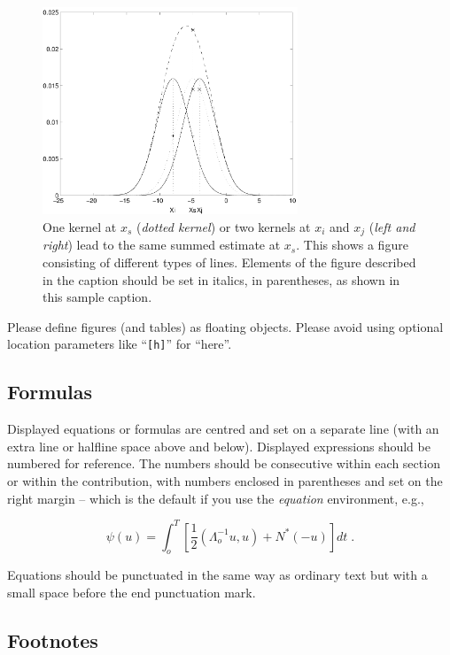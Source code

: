\documentclass[runningheads,a4paper]{llncs}
\begin{document}
\begin{figure}
	\centering
	\includegraphics[height=6.2cm]{graphic.pdf}
	\caption{One kernel at $x_s$ (\emph{dotted kernel}) or two kernels at
	$x_i$ and $x_j$ (\textit{left and right}) lead to the same summed estimate
	at $x_s$. This shows a figure consisting of different types of
	lines. Elements of the figure described in the caption should be set in
	italics, in parentheses, as shown in this sample caption.}
	\label{fig:example}
\end{figure}

Please define figures (and tables) as floating objects. Please avoid
using optional location parameters like ``\verb+[h]+'' for ``here''.

\subsection{Formulas}

Displayed equations or formulas are centred and set on a separate
line (with an extra line or halfline space above and below). Displayed
expressions should be numbered for reference. The numbers should be
consecutive within each section or within the contribution,
with numbers enclosed in parentheses and set on the right margin --
which is the default if you use the \emph{equation} environment, e.g.,

\begin{equation}
  \psi (u) = \int_{o}^{T} \left[\frac{1}{2}
  \left(\Lambda_{o}^{-1} u,u\right) + N^{\ast} (-u)\right] dt \;  .
\end{equation}

Equations should be punctuated in the same way as ordinary
text but with a small space before the end punctuation mark.

\subsection{Footnotes}
\end{document}
